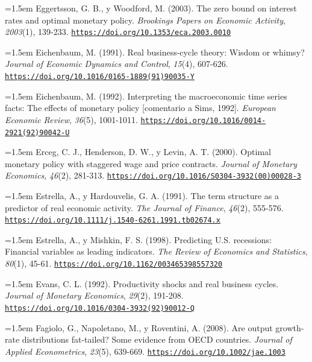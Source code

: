 \documentclass[10pt,a4paper]{article}
\begin{document}
\noindent\hangindent=1.5em Eggertsson, G. B., y Woodford, M. (2003). The zero bound on interest rates and optimal monetary policy. \textit{Brookings Papers on Economic Activity}, \textit{2003}(1), 139-233. \href{https://doi.org/10.1353/eca.2003.0010}{\nolinkurl{https://doi.org/10.1353/eca.2003.0010}}

\noindent\hangindent=1.5em Eichenbaum, M. (1991). Real business-cycle theory: Wisdom or whimsy? \textit{Journal of Economic Dynamics and Control}, \textit{15}(4), 607-626. \href{https://doi.org/10.1016/0165-1889(91)90035-Y}{\nolinkurl{https://doi.org/10.1016/0165-1889(91)90035-Y}}

\noindent\hangindent=1.5em Eichenbaum, M. (1992). Interpreting the macroeconomic time series facts: The effects of monetary policy [comentario a Sims, 1992]. \textit{European Economic Review}, \textit{36}(5), 1001-1011. \href{https://doi.org/10.1016/0014-2921(92)90042-U}{\nolinkurl{https://doi.org/10.1016/0014-2921(92)90042-U}}

\noindent\hangindent=1.5em Erceg, C. J., Henderson, D. W., y Levin, A. T. (2000). Optimal monetary policy with staggered wage and price contracts. \textit{Journal of Monetary Economics}, \textit{46}(2), 281-313. \href{https://doi.org/10.1016/S0304-3932(00)00028-3}{\nolinkurl{https://doi.org/10.1016/S0304-3932(00)00028-3}}

\noindent\hangindent=1.5em Estrella, A., y Hardouvelis, G. A. (1991). The term structure as a predictor of real economic activity. \textit{The Journal of Finance}, \textit{46}(2), 555-576. \href{https://doi.org/10.1111/j.1540-6261.1991.tb02674.x}{\nolinkurl{https://doi.org/10.1111/j.1540-6261.1991.tb02674.x}}

\noindent\hangindent=1.5em Estrella, A., y Mishkin, F. S. (1998). Predicting U.S. recessions: Financial variables as leading indicators. \textit{The Review of Economics and Statistics}, \textit{80}(1), 45-61. \href{https://doi.org/10.1162/003465398557320}{\nolinkurl{https://doi.org/10.1162/003465398557320}}

\noindent\hangindent=1.5em Evans, C. L. (1992). Productivity shocks and real business cycles. \textit{Journal of Monetary Economics}, \textit{29}(2), 191-208. \href{https://doi.org/10.1016/0304-3932(92)90012-Q}{\nolinkurl{https://doi.org/10.1016/0304-3932(92)90012-Q}}

\noindent\hangindent=1.5em Fagiolo, G., Napoletano, M., y Roventini, A. (2008). Are output growth-rate distributions fat-tailed? Some evidence from OECD countries. \textit{Journal of Applied Econometrics}, \textit{23}(5), 639-669. \href{https://doi.org/10.1002/jae.1003}{\nolinkurl{https://doi.org/10.1002/jae.1003}}
\end{document}
